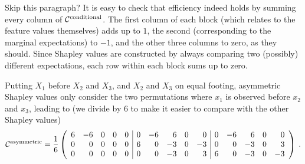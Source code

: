 \documentclass{article}
\newcommand{\bx}{\bar{x}}
\newcommand{\allmeans}{{\cal X}}
\newcommand{\contmat}{{\cal C}}
\newcommand{\boven}[2]{#1^{\mbox{\scriptsize #2}}}
\newcommand{\comment}[1]{{\color{red} #1}}
\begin{document}
\comment{Skip this paragraph?}
It is easy to check that efficiency indeed holds by summing every column of $\boven{\contmat}{conditional}$. The first column of each block (which relates to the feature values themselves) adds up to $1$, the second (corresponding to the marginal expectations) to $-1$, and the other three columns to zero, as they should. Since Shapley values are constructed by always comparing two (possibly) different expectations, each row within each block sums up to zero.


Putting $X_1$ before $X_2$ and $X_3$, and $X_2$ and $X_3$ on equal footing, asymmetric Shapley values only consider the two permutations where $x_1$ is observed before $x_2$ and $x_3$, leading to (we divide by 6 to make it easier to compare with the other Shapley values)
\[
\boven{\contmat}{asymmetric} = {1 \over 6} \left(\begin{array}{rrrrr|rrrrr|rrrrr}
6 & -6 & 0 & 0 & 0  &
0 & -6 & 6 & 0 & 0  &
0 & -6 & 6 & 0 & 0 \\ 
0 & 0 & 0 & 0 & 0  &
6 & 0 & -3 & 0 & -3  &
0 & 0 & -3 & 0 & 3 \\ 
0 & 0 & 0 & 0 & 0  &
0 & 0 & -3 & 0 & 3  &
6 & 0 & -3 & 0 & -3
\end{array}\right) \: .
\]
\end{document}
